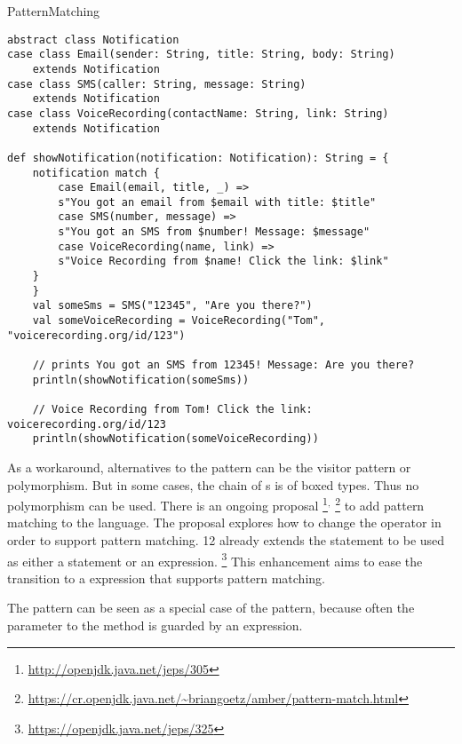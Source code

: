\begin{pattern}{PatternMatching}
\begin{verbatim}
abstract class Notification
case class Email(sender: String, title: String, body: String)
	extends Notification
case class SMS(caller: String, message: String)
	extends Notification
case class VoiceRecording(contactName: String, link: String)
	extends Notification

def showNotification(notification: Notification): String = {
	notification match {
		case Email(email, title, _) =>
		s"You got an email from $email with title: $title"
		case SMS(number, message) =>
		s"You got an SMS from $number! Message: $message"
		case VoiceRecording(name, link) =>
		s"Voice Recording from $name! Click the link: $link"
	}
	}
	val someSms = SMS("12345", "Are you there?")
	val someVoiceRecording = VoiceRecording("Tom", "voicerecording.org/id/123")
	
	// prints You got an SMS from 12345! Message: Are you there?
	println(showNotification(someSms))
	
	// Voice Recording from Tom! Click the link: voicerecording.org/id/123	
	println(showNotification(someVoiceRecording))
\end{verbatim}

As a workaround, alternatives to the \thisp{} pattern can be the visitor pattern or polymorphism.
But in some cases, the chain of s is of boxed types.
Thus no polymorphism can be used.
There is an ongoing proposal%
\footnote{\url{http://openjdk.java.net/jeps/305}}$^{,}$%
\footnote{\url{https://cr.openjdk.java.net/~briangoetz/amber/pattern-match.html}}
to add pattern matching to the \java{} language.
The proposal explores how to change the  operator in order to support pattern matching.
%
%
\java{} 12 already extends the  statement to be used as either a statement or an expression.%
\footnote{\url{https://openjdk.java.net/jeps/325}}
This enhancement aims to ease the transition to a  expression that supports pattern matching.

\related{}
The  pattern can be seen as a special case of the \thisp{} pattern,
because often the parameter to the  method is guarded by an  expression.
\end{pattern}
